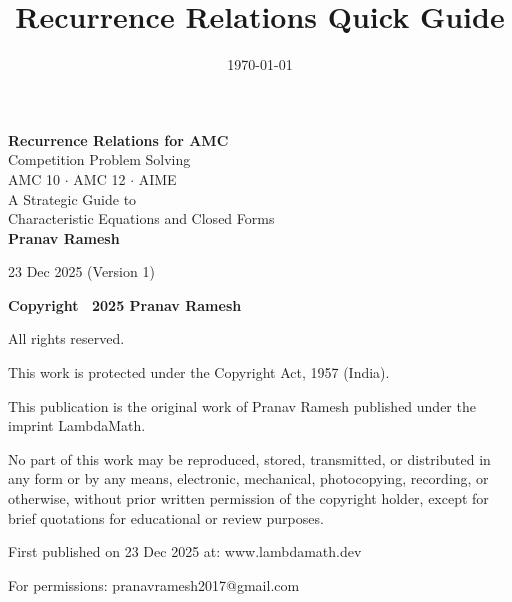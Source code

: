 \documentclass[12pt]{extarticle}
\title{Recurrence Relations Quick Guide}
\author{}
\date{\today}
\begin{document}
\begin{titlepage}
\centering
\vspace*{2cm}

{\Huge\bfseries Recurrence Relations for AMC}\\[0.5cm]
{\Large Competition Problem Solving}\\[2cm]

{\large AMC 10 $\cdot$ AMC 12 $\cdot$ AIME}\\[3cm]

{\Large A Strategic Guide to\\[0.3cm]
Characteristic Equations and Closed Forms}\\[3cm]
{\Large\textbf{Pranav Ramesh}}\\[3cm]
\vfill

{\large 23 Dec 2025 (Version 1)}
\end{titlepage}

\thispagestyle{empty}
\vspace*{\fill}
\begin{center}
\textbf{\Large Copyright \textcopyright\ 2025 Pranav Ramesh}

All rights reserved.

This work is protected under the Copyright Act, 1957 (India).

\vspace{1.5cm}

This publication is the original work of Pranav Ramesh published under the imprint LambdaMath.

\vspace{1.5cm}

No part of this work may be reproduced, stored, transmitted, or distributed in any form or by any means, electronic, mechanical, photocopying, recording, or otherwise, without prior written permission of the copyright holder, except for brief quotations for educational or review purposes.

\vspace{1.5cm}

First published on 23 Dec 2025 at: www{.}lambdamath{.}dev

For permissions: pranavramesh2017@gmail{.}com
\end{center}
\vspace*{\fill}

\newpage
\end{document}
